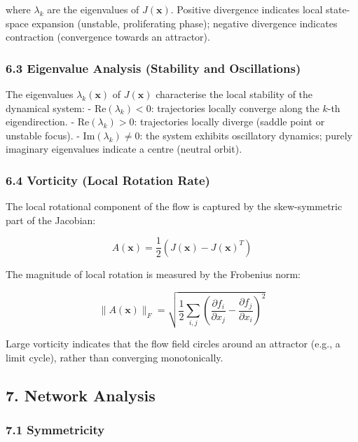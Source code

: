\documentclass[11pt]{article}
\begin{document}
where $\lambda_k$ are the eigenvalues of $J(\mathbf{x})$. Positive divergence indicates local state-space expansion (unstable, proliferating phase); negative divergence indicates contraction (convergence towards an attractor).


\subsubsection*{6.3 Eigenvalue Analysis (Stability and Oscillations)}

The eigenvalues $\lambda_k(\mathbf{x})$ of $J(\mathbf{x})$ characterise the local stability of the dynamical system:
- $\text{Re}(\lambda_k) < 0$: trajectories locally converge along the $k$-th eigendirection.
- $\text{Re}(\lambda_k) > 0$: trajectories locally diverge (saddle point or unstable focus).
- $\text{Im}(\lambda_k) \neq 0$: the system exhibits oscillatory dynamics; purely imaginary eigenvalues indicate a centre (neutral orbit).


\subsubsection*{6.4 Vorticity (Local Rotation Rate)}

The local rotational component of the flow is captured by the skew-symmetric part of the Jacobian:


\begin{equation}
A(\mathbf{x}) = \frac{1}{2}\left(J(\mathbf{x}) - J(\mathbf{x})^T\right) 
\end{equation}


The magnitude of local rotation is measured by the Frobenius norm:


\begin{equation}
\|A(\mathbf{x})\|_F = \sqrt{\frac{1}{2}\sum_{i,j}\left(\frac{\partial f_i}{\partial x_j} - \frac{\partial f_j}{\partial x_i}\right)^2} 
\end{equation}


Large vorticity indicates that the flow field circles around an attractor (e.g., a limit cycle), rather than converging monotonically.



\subsection*{7. Network Analysis}


\subsubsection*{7.1 Symmetricity}
\end{document}
